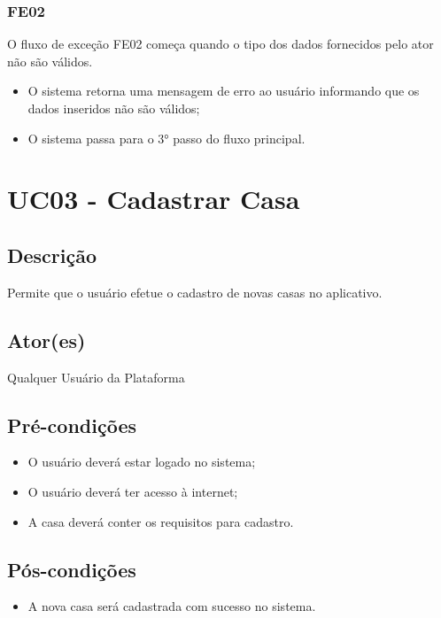 \begin{anexosenv}
        \subsubsection{FE02}
            O fluxo de exceção FE02 começa quando o tipo dos dados fornecidos pelo ator não são válidos.
            \begin{itemize}
                \item O sistema retorna uma mensagem de erro ao usuário informando que os dados inseridos não são válidos;
                \item O sistema passa para o 3° passo do fluxo principal.
            \end{itemize}

\section{UC03 \-- Cadastrar Casa}
    \subsection{Descrição}
        Permite que o usuário efetue o cadastro de novas casas no aplicativo.
    \subsection{Ator(es)}
        Qualquer Usuário da Plataforma
    \subsection{Pré-condições}
        \begin{itemize}
            \item O usuário deverá estar logado no sistema;
            \item O usuário deverá ter acesso à internet;
            \item A casa deverá conter os requisitos para cadastro.
        \end{itemize}
    \subsection{Pós-condições}
        \begin{itemize}
            \item A nova casa será cadastrada com sucesso no sistema.
        \end{itemize}

\end{anexosenv}
